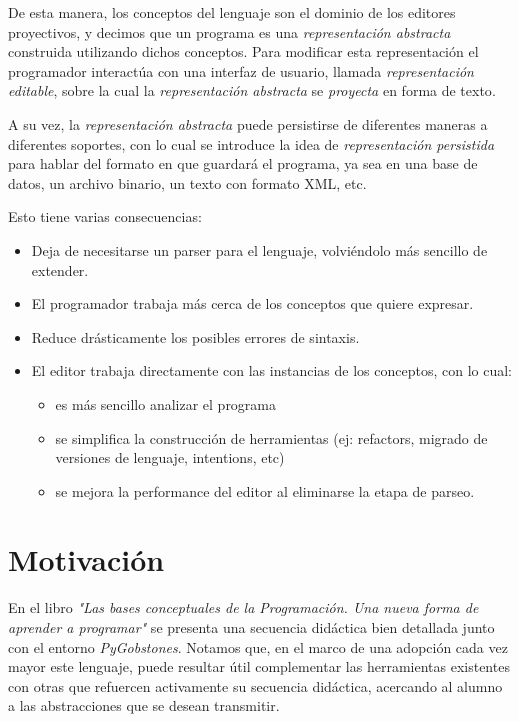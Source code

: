 De esta manera, los conceptos del lenguaje son el dominio de los editores proyectivos, y decimos que un programa es una \textit{representación abstracta} construida utilizando dichos conceptos. Para modificar esta representación el programador interactúa con una interfaz de usuario, llamada \textit{representación editable}, sobre la cual la \textit{representación abstracta} se \textit{proyecta} en forma de texto\cite{voelter2014projectional}. 


A su vez, la \textit{representación abstracta} puede persistirse de diferentes maneras a diferentes soportes, con lo cual se introduce la idea de \textit{representación persistida} para hablar del formato en que guardará el programa, ya sea en una base de datos, un archivo binario, un texto con formato XML, etc.


Esto tiene varias consecuencias:
\begin{itemize}
  \item Deja de necesitarse un parser para el lenguaje, volviéndolo más sencillo de extender.
  \item El programador trabaja más cerca de los conceptos que quiere expresar.
  \item Reduce drásticamente los posibles errores de sintaxis.
  \item El editor trabaja directamente con las instancias de los conceptos, con lo cual:
  \begin{itemize}
    \item es más sencillo analizar el programa
    \item se simplifica la construcción de herramientas (ej: refactors, migrado de versiones de lenguaje, intentions, etc)
    \item se mejora la performance del editor al eliminarse la etapa de parseo.
  \end{itemize}
\end{itemize}


\section{Motivación}

En el libro \textit{"Las bases conceptuales de la Programación. Una nueva forma de aprender a programar"}\cite{Gobstones} se presenta una secuencia didáctica bien detallada junto con el entorno \textit{PyGobstones}\cite{PyGobstones}. Notamos que, en el marco de una adopción cada vez mayor este lenguaje, puede resultar útil complementar las herramientas existentes con otras que refuercen activamente su secuencia didáctica, acercando al alumno a las abstracciones que se desean transmitir.

